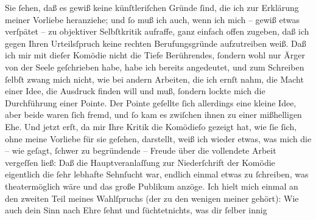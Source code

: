 \begin{ledgroupsized}[t]{13cm}
           Sie ſehen, daß es gewiß keine künſtleriſchen Gründe ſind, die ich zur Erklärung
               meiner Vorliebe heranziehe; und ſo muß ich auch, wenn {\pb}ich mich – gewiß etwas verſpätet – zu objektiver Selbſtkritik aufraffe, ganz
               einfach offen zugeben, daß ich gegen Ihren Urteilsſpruch keine rechten
               Berufungsgründe aufzutreiben weiß. Daß ich mir mit dieſer Komödie nicht die Tiefe
               Berührendes, ſondern wohl nur Ärger von der Seele geſchrieben habe, habe ich bereits
               angedeutet, und zum Schreiben ſelbſt zwang mich nicht, wie bei andern Arbeiten, die
               ich ernſt nahm, die Macht einer Idee, die Ausdruck finden will und muß, ſondern
               lockte mich die Durchführung einer Pointe. Der Pointe geſellte ſich allerdings eine
               kleine Idee, aber beide waren ſich fremd, und ſo kam es zwiſchen ihnen zu einer
               mißhelligen Ehe.\pend
           \pstart
           Und jetzt erſt, da mir Ihre Kritik die Komödieſo gezeigt hat, wie ſie ſich, ohne meine Vorliebe
               für sie geſehen, darstellt, weiß ich wieder etwas,
               was mich die – wie geſagt, ſchwer zu begründende – Freude über die vollendete Arbeit
               vergeſſen ließ: Daß die Hauptveranlaſſung zur Niederſchrift der Komödie eigentlich
               die ſehr lebhafte Sehnſucht war, endlich einmal etwas zu ſchreiben, was
               theatermöglich wäre und das große Publikum anzöge. Ich hielt mich einmal an den
               zweiten Teil meines Wahlſpruchs (der zu den wenigen meiner \label{K_L02215-1v}\label{K_L02215-1h} gehört):\pend
           \stanza{}{\pb}Wie auch dein Sinn nach Ehre
                     ſehnt und ſüchtet\newverse{}nichts, was dir ſelber innig

\end{ledgroupsized}
